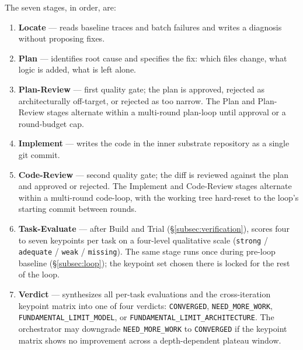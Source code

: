 The seven stages, in order, are:

\begin{enumerate}
  \item \textbf{Locate} --- reads baseline traces and batch failures and writes a diagnosis without proposing fixes.
  \item \textbf{Plan} --- identifies root cause and specifies the fix: which files change, what logic is added, what is left alone.
  \item \textbf{Plan-Review} --- first quality gate; the plan is approved, rejected as architecturally off-target, or rejected as too narrow. The Plan and Plan-Review stages alternate within a multi-round plan-loop until approval or a round-budget cap.
  \item \textbf{Implement} --- writes the code in the inner substrate repository as a single git commit.
  \item \textbf{Code-Review} --- second quality gate; the diff is reviewed against the plan and approved or rejected. The Implement and Code-Review stages alternate within a multi-round code-loop, with the working tree hard-reset to the loop's starting commit between rounds.
  \item \textbf{Task-Evaluate} --- after Build and Trial (\S\ref{subsec:verification}), scores four to seven keypoints per task on a four-level qualitative scale (\texttt{strong} / \texttt{adequate} / \texttt{weak} / \texttt{missing}). The same stage runs once during pre-loop baseline (\S\ref{subsec:loop}); the keypoint set chosen there is locked for the rest of the loop.
  \item \textbf{Verdict} --- synthesizes all per-task evaluations and the cross-iteration keypoint matrix into one of four verdicts: \texttt{CONVERGED}, \texttt{NEED\_MORE\_WORK}, \texttt{FUNDAMENTAL\_LIMIT\_MODEL}, or \texttt{FUNDAMENTAL\_LIMIT\_ARCHITECTURE}. The orchestrator may downgrade \texttt{NEED\_MORE\_WORK} to \texttt{CONVERGED} if the keypoint matrix shows no improvement across a depth-dependent plateau window.
\end{enumerate}


